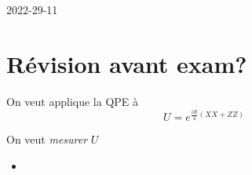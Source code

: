 


2022-29-11


\section*{Révision avant exam?}
On veut applique la QPE à $$U = e^{\frac{iR}{4} (X X + ZZ)}$$ 

On veut \textit{mesurer} $U$ 

\begin{itemize}[\alpha]
	\item
\end{itemize}


